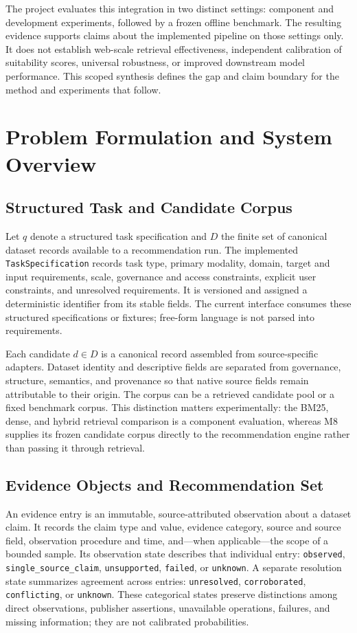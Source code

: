 \documentclass[conference]{IEEEtran}
\begin{document}
The project evaluates this integration in two distinct settings: component and development experiments, followed by a frozen offline benchmark. The resulting evidence supports claims about the implemented pipeline on those settings only. It does not establish web-scale retrieval effectiveness, independent calibration of suitability scores, universal robustness, or improved downstream model performance. This scoped synthesis defines the gap and claim boundary for the method and experiments that follow.

\section{Problem Formulation and System Overview}
\subsection{Structured Task and Candidate Corpus}
Let $q$ denote a structured task specification and $D$ the finite set of canonical dataset records available to a recommendation run. The implemented \texttt{TaskSpecification} records task type, primary modality, domain, target and input requirements, scale, governance and access constraints, explicit user constraints, and unresolved requirements. It is versioned and assigned a deterministic identifier from its stable fields. The current interface consumes these structured specifications or fixtures; free-form language is not parsed into requirements.

Each candidate $d\in D$ is a canonical record assembled from source-specific adapters. Dataset identity and descriptive fields are separated from governance, structure, semantics, and provenance so that native source fields remain attributable to their origin. The corpus can be a retrieved candidate pool or a fixed benchmark corpus. This distinction matters experimentally: the BM25, dense, and hybrid retrieval comparison is a component evaluation, whereas M8 supplies its frozen candidate corpus directly to the recommendation engine rather than passing it through retrieval.

\subsection{Evidence Objects and Recommendation Set}
An evidence entry is an immutable, source-attributed observation about a dataset claim. It records the claim type and value, evidence category, source and source field, observation procedure and time, and—when applicable—the scope of a bounded sample. Its observation state describes that individual entry: \texttt{observed}, \texttt{single\_source\_claim}, \texttt{unsupported}, \texttt{failed}, or \texttt{unknown}. A separate resolution state summarizes agreement across entries: \texttt{unresolved}, \texttt{corroborated}, \texttt{conflicting}, or \texttt{unknown}. These categorical states preserve distinctions among direct observations, publisher assertions, unavailable operations, failures, and missing information; they are not calibrated probabilities.
\end{document}
